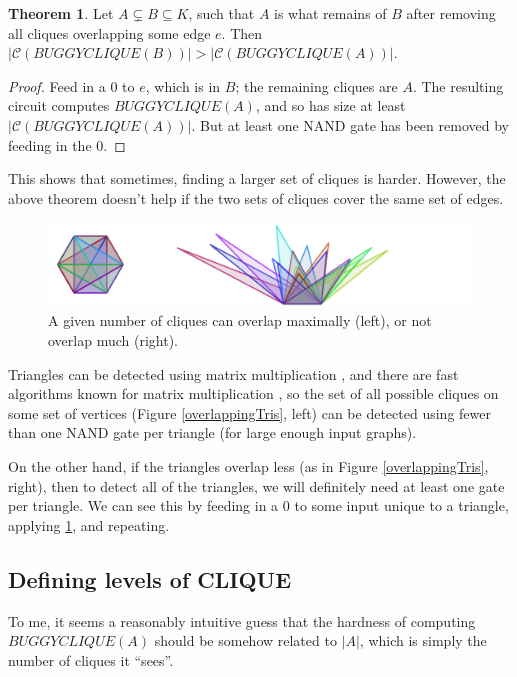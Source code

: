 \documentclass[12pt]{article}
\theoremstyle{definition}
\newtheorem{thm}{Theorem}[section]
\newcommand{\bigC}[0]{\mathcal{C}}
\begin{document}
\begin{thm}
\label{edgeZonking}
Let $A \subsetneq B \subseteq K$, such that $A$ is what remains
of $B$ after removing all cliques overlapping some edge $e$.
Then $|\bigC(BUGGYCLIQUE(B))| > |\bigC(BUGGYCLIQUE(A))|$.
\end{thm}
\begin{proof}
Feed in a 0 to $e$, which is in $B$; the remaining cliques are $A$.
The resulting
circuit computes $BUGGYCLIQUE(A)$, and so has size
at least $|\bigC(BUGGYCLIQUE(A))|$. But at least one
NAND gate has been removed by feeding in the 0.
\end{proof}

This shows that sometimes, finding a larger set of cliques is
harder. However, the above theorem doesn't help if the two
sets of cliques cover the same set of edges.

\begin{figure}
\label{overlappingTris}
\centering
\includegraphics[width=1\textwidth]{R/tri1.pdf}
\caption{A given number of cliques can overlap maximally (left),
or not overlap much (right).}
\label{fig:overlappingTriangles}
\end{figure}

Triangles can be detected using matrix multiplication \cite{itai_finding_1977},
and there are fast algorithms known for matrix multiplication
\cite{strassen_gaussian_1969}
\cite{williams_multiplying_2012}, so the set of all possible
cliques on some set of vertices (Figure \ref{overlappingTris}, left)
 can be detected
using fewer than one NAND gate per triangle (for large enough input graphs).

On the other hand, if the triangles overlap less (as in
Figure \ref{overlappingTris}, right),
then to detect all of the triangles, we will definitely need at least one
gate per triangle. We can see this by feeding in a 0 to some input
unique to a triangle, applying \ref{edgeZonking}, and repeating.

\subsection{Defining levels of CLIQUE}

To me, it seems a reasonably intuitive guess that the hardness of
computing $BUGGYCLIQUE(A)$ should be somehow related to
$|A|$, which is simply the number of cliques it ``sees''.
\end{document}
